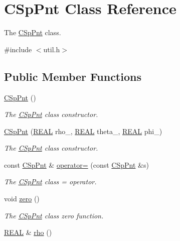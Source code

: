 \hypertarget{classCSpPnt}{\section{C\-Sp\-Pnt Class Reference}
\label{classCSpPnt}
}


The \hyperlink{classCSpPnt}{C\-Sp\-Pnt} class.  




{\ttfamily \#include $<$util.\-h$>$}

\subsection*{Public Member Functions}
\begin{DoxyCompactItemize}
\item 
\hyperlink{classCSpPnt_ab2366cfde717accefce56fc72aa5a2ed}{C\-Sp\-Pnt} ()
\begin{DoxyCompactList}\small\item\em The \hyperlink{classCSpPnt}{C\-Sp\-Pnt} class constructor. \end{DoxyCompactList}\item 
\hyperlink{classCSpPnt_a2d035000bbff43189d79affc0447a9a3}{C\-Sp\-Pnt} (\hyperlink{util_8h_a5821460e95a0800cf9f24c38915cbbde}{R\-E\-A\-L} rho\-\_\-, \hyperlink{util_8h_a5821460e95a0800cf9f24c38915cbbde}{R\-E\-A\-L} theta\-\_\-, \hyperlink{util_8h_a5821460e95a0800cf9f24c38915cbbde}{R\-E\-A\-L} phi\-\_\-)
\begin{DoxyCompactList}\small\item\em The \hyperlink{classCSpPnt}{C\-Sp\-Pnt} class constructor. \end{DoxyCompactList}\item 
const \hyperlink{classCSpPnt}{C\-Sp\-Pnt} \& \hyperlink{classCSpPnt_aee31a3b97c734fa150f1a33daadd6dfc}{operator=} (const \hyperlink{classCSpPnt}{C\-Sp\-Pnt} \&s)
\begin{DoxyCompactList}\small\item\em The \hyperlink{classCSpPnt}{C\-Sp\-Pnt} class = operator. \end{DoxyCompactList}\item 
void \hyperlink{classCSpPnt_a9525366e1c144421d07c0a1485256f82}{zero} ()
\begin{DoxyCompactList}\small\item\em The \hyperlink{classCSpPnt}{C\-Sp\-Pnt} class zero function. \end{DoxyCompactList}\item 
\hyperlink{util_8h_a5821460e95a0800cf9f24c38915cbbde}{R\-E\-A\-L} \& \hyperlink{classCSpPnt_af6364f003b923aa77c880869d27caa64}{rho} ()

\end{DoxyCompactItemize}
